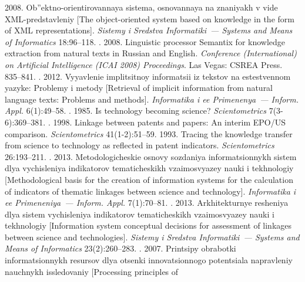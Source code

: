 \begin{multicols}{2}
{{\begin{thebibliography}{99}
       2008. Ob''ektno-orientirovannaya sistema, osnovannaya na znaniyakh v 
vide XML-predstavleniy [The object-oriented system based on knowledge in the form of XML 
representations]. \textit{Sistemy i
Sredstva Informatiki~---
Systems and Means of Informatics} 18:96--118.
      . 2008. Linguistic processor Semantix for 
knowledge extraction from natural texts in Russian and English. \textit{Conference (International) on 
Artificial Intelligence (ICAI 2008) Proceedings}. Las Vegas: CSREA Press. 835--841.
      . 2012. Vyyavlenie implitsitnoy informatsii iz tekstov 
na estestvennom yazyke: Problemy i metody [Retrieval of implicit information from natural language 
texts: Problems and methods]. \textit{Informatika i ee Primenenya~---
Inform. Appl.}  6(1):49--58.
      . 1985. Is technology becoming science? \textit{Scientometrics}  
7(3-6):369--381.
      . 1998. Linkage between patents and papers: An interim 
EPO/US comparison. \textit{Scientometrics}  41(1-2):51--59.
       1993. Tracing the knowledge transfer from science to technology as 
reflected in patent indicators. \textit{Scientometrics} 26:193--211.
      . 2013.  
Metodologicheskie osnovy so\-zda\-niya informatsionnykh sistem dlya vychisleniya indikatorov 
tematicheskikh vzaimosvyazey nauki i tekhnologiy [Methodological basis for the creation of information 
systems for the calculation of indicators of thematic linkages between science and technology]. 
\textit{Informatika i ee Primeneniya~--- Inform. Appl.} 7(1):70--81.
      . 2013. 
Arkhitekturnye resheniya dlya sistem vychisleniya indikatorov tematicheskikh vzaimosvyazey nauki i 
tekhnologiy [Information system conceptual decisions for assessment of linkages between science and 
technologies]. \textit{Sistemy i
Sredstva Informatiki~---
Systems and Means of Informatics}   23(2):260--283.
      . 2007. Printsipy obrabotki informatsionnykh resursov dlya 
otsenki innovatsionnogo potentsiala napravleniy nauchnykh issledovaniy [Processing principles of 

\end{thebibliography}}}
\end{multicols}
